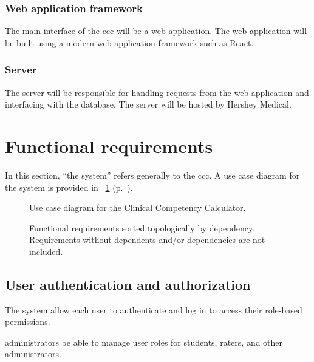 \documentclass[letterpaper,article,oneside]{memoir}
\begin{document}
\subsubsection{Web application framework}

The main interface of the \gls{ccc} will be a web application.
The web application will be built using a modern web application framework such as React.

\subsubsection{Server}

The server will be responsible for handling requests from the web application and interfacing with the database.
The server will be hosted by Hershey Medical.

\section{Functional requirements}\label{sec:functional-requirements}

In this section, ``the system'' refers generally to the \gls{ccc}.
A use case diagram for the system is provided in \figurename~\ref{fig:use-case-diagram} (p.~\pageref{fig:use-case-diagram}).

\begin{figure}
  \centering
  
  \caption{Use case diagram for the Clinical Competency Calculator.}
  \label{fig:use-case-diagram}
\end{figure}

\begin{figure}
  \centering
  
  \caption[Functional requirements sorted topologically by dependency.]{Functional requirements sorted topologically by dependency. Requirements without dependents and/or dependencies are not included.}
  \label{fig:fr-topo-tree}
\end{figure}

\subsection{User authentication and authorization}

\begin{requirements}
   The system  allow each \gls{user} to authenticate and log in to access their role-based permissions.

   \Glspl{administrator}  be able to manage user roles for \glspl{student}, \glspl{rater}, and other \glspl{administrator}.
   \dep{\ref{req:auth1}}
\end{requirements}
\end{document}
